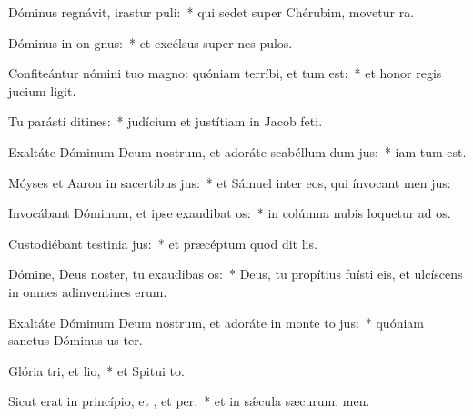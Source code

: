\item Dóminus regnávit, irastur puli:~* qui sedet super Chérubim, movetur ra.
\item Dóminus in on gnus:~* et excélsus super nes pulos.
\item Confiteántur nómini tuo magno: quóniam terríbi, et tum est:~* et honor regis jucium ligit.
\item Tu parásti ditines:~* judícium et justítiam in Jacob  feti.
\item Exaltáte Dóminum Deum nostrum, et adoráte scabéllum dum jus:~* iam tum est.
\item Móyses et Aaron in sacertibus jus:~* et Sámuel inter eos, qui ínvocant men jus:
\item Invocábant Dóminum, et ipse exaudibat os:~* in colúmna nubis loquetur ad os.
\item Custodiébant testinia jus:~* et præcéptum quod dit lis.
\item Dómine, Deus noster, tu exaudibas os:~* Deus, tu propítius fuísti eis, et ulcíscens in omnes adinventines erum.
\item Exaltáte Dóminum Deum nostrum, et adoráte in monte to jus:~* quóniam sanctus Dóminus us ter.
\item Glória tri, et lio,~* et Spitui to.
\item Sicut erat in princípio, et , et per,~* et in sǽcula sæcurum. men.
